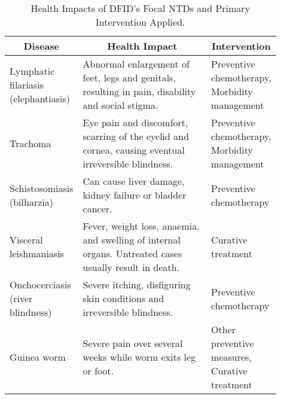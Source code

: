 \begin{table}[htbp]
	\centering
	\caption{Health Impacts of DFID's Focal NTDs and Primary Intervention Applied.}\label{tab:ntd_impact}
	\begin{tabular}{p{0.15\linewidth}p{0.5\linewidth}p{0.25\linewidth}}
		\toprule
		\multicolumn{1}{c}{\textbf{Disease}} & \multicolumn{1}{c}{\textbf{Health Impact}} & \multicolumn{1}{c}{\textbf{Intervention}} \\ \hline
		\rule{0pt}{10pt}Lymphatic filariasis (elephantiasis) &	Abnormal enlargement of feet, legs and genitals, resulting in pain, disability and social stigma.	& Preventive chemotherapy, Morbidity management \\
		Trachoma &Eye pain and discomfort, scarring of the eyelid and cornea, causing eventual irreversible blindness. & Preventive chemotherapy, Morbidity management \\
		Schistosomiasis (bilharzia)	& Can cause liver damage, kidney failure or bladder cancer. &	Preventive chemotherapy \\
		Visceral leishmaniasis & Fever, weight loss, anaemia, and swelling of internal organs. Untreated cases usually result in death. &	Curative treatment \\
		Onchocerciasis (river blindness) & Severe itching, disfiguring skin conditions and irreversible blindness. &	Preventive chemotherapy \\
		Guinea worm & Severe pain over several weeks while worm exits leg or foot.   & Other preventive measures, Curative treatment \\
		\bottomrule
	\end{tabular}
\end{table}



\newpage
